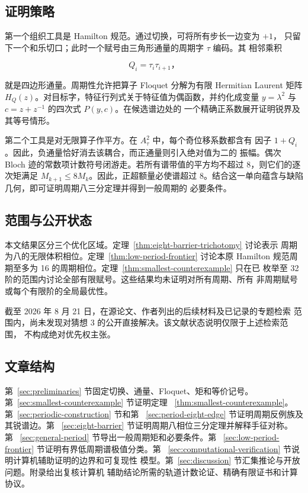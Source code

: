 \subsection{证明策略}

第一个组织工具是 Hamilton 规范。通过切换，可将所有步长一边变为 \(+1\)，
只留下一个和乐切口；此时一个赋号由三角形通量的周期字 \(\tau\) 编码。其
相邻乘积

\begin{equation}
Q_i=\tau_i \tau_{i+1}\text{，}
\end{equation}

就是四边形通量。周期性允许把算子 Floquet 分解为有限 Hermitian Laurent
矩阵 \(H_Q(z)\)。对目标字，特征行列式关于特征值为偶函数，并约化成变量
\(y=\lambda^{2}\) 与 \(c=z+z^{-1}\) 的四次式 \(P(y,c)\)。在候选谱边处的
一个精确正系数展开证明锐界及其等号情形。

第二个工具是对无限算子作平方。在 \(A_\tau^{2}\) 中，每个奇位移系数都含有
因子 \(1+Q_i\)。因此，负通量恰好消去该耦合，而正通量则引入绝对值为二的
振幅。偶次 Bloch 迹的常数项计数符号闭游走。若所有谱带值的平方均不超过
8，则它们的逐次矩满足 \(M_{k+1}\leq 8M_k\)。因此，正超额量必使谱超过
8。结合这一单向蕴含与缺陷几何，即可证明周期八三分定理并得到一般周期的
必要条件。

\subsection{范围与公开状态}

本文结果区分三个优化区域。定理~\ref{thm:eight-barrier-trichotomy} 讨论表示
周期为八的无限体积相位。定理~\ref{thm:low-period-frontier} 讨论本原 Hamilton
规范周期至多为 16 的周期相位。定理~\ref{thm:smallest-counterexample} 只在已
枚举至 32 阶的范围内讨论全部有限赋号。这些结果均未证明对所有周期、所有
非周期赋号或每个有限阶的全局最优性。

截至 2026 年 8 月 21 日，在源论文、作者列出的后续材料及已记录的专题检索
范围内，尚未发现对猜想 3 的公开直接解决。该文献状态说明仅限于上述检索范围，
不构成绝对优先权主张。

\subsection{文章结构}

第~\ref{sec:preliminaries} 节固定切换、通量、Floquet、矩和等价记号。
第~\ref{sec:smallest-counterexample} 节证明定理~
\ref{thm:smallest-counterexample}。第~\ref{sec:periodic-construction} 节和第~
\ref{sec:period-eight-edge} 节证明周期反例族及其锐谱边。第~
\ref{sec:eight-barrier} 节证明周期八相位三分定理并解释手征对称。第~
\ref{sec:general-period} 节导出一般周期矩和必要条件。第~
\ref{sec:low-period-frontier} 节证明有界低周期谱极值分类。第~
\ref{sec:computational-verification} 节说明计算机辅助证明的边界和可复现性
模型。第~\ref{sec:discussion} 节汇集推论与开放问题。附录给出复核计算机
辅助结论所需的轨道计数论证、精确有限证书和计算协议。
